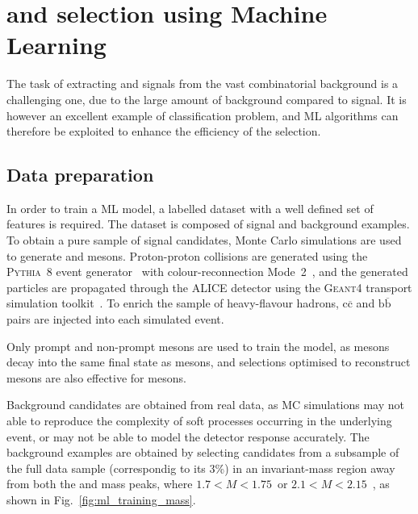 \section{\texorpdfstring{\ds and \dpl selection using Machine Learning}{Ds+ and D+ selection using Machine Learning}}

The task of extracting \ds and \dpl signals from the vast combinatorial background is a challenging one, due to the large amount of background compared to signal. It is however an excellent example of classification problem, and ML algorithms can therefore be exploited to enhance the efficiency of the selection. 

\subsection{Data preparation}
In order to train a ML model, a labelled dataset with a well defined set of features is required. The dataset is composed of signal and background examples. To obtain a pure sample of signal candidates, Monte Carlo simulations are used to generate \ds and \dpl mesons. Proton-proton collisions are generated using the \textsc{Pythia~8} event generator~\cite{Bierlich:2022pfr} with colour-reconnection Mode~2~\cite{Christiansen:2015yqa}, and the generated particles are propagated through the ALICE detector using the \textsc{Geant4} transport simulation toolkit~\cite{GEANT4:2002zbu}. To enrich the sample of heavy-flavour hadrons, $\mathrm{c\overline{c}}$ and $\mathrm{b\overline{b}}$ pairs are injected into each simulated event. 



Only prompt and non-prompt \ds mesons are used to train the model, as \dpl mesons decay into the same final state as \ds mesons, and selections optimised to reconstruct \ds mesons are also effective for \dpl mesons. 

Background candidates are obtained from real data, as MC simulations may not able to reproduce the complexity of soft processes occurring in the underlying event, or may not be able to model the detector response accurately. The background examples are obtained by selecting candidates from a subsample of the full data sample (correspondig to its 3\%) in an invariant-mass region away from both the \ds and \dpl mass peaks, where $1.7 < M < 1.75$~\gevcc or \mbox{$2.1 < M < 2.15$~\gevcc}, as shown in Fig.~\ref{fig:ml_training_mass}. 

